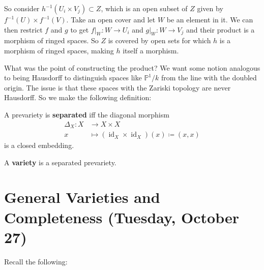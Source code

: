 So consider \(h^{-1} (U_i \times V_j) \subset Z\), which is an open
subset of \(Z\) given by \(f^{-1}(U) \times f^{-1}(V)\). Take an open
cover and let \(W\) be an element in it. We can then restrict \(f\) and
\(g\) to get \({ \left.{{f}} \right|_{{W}} }:W\to U_i\) and
\({ \left.{{g}} \right|_{{W}} }:W\to V_j\) and their product is a
morphism of ringed spaces. So \(Z\) is covered by open sets for which
\(h\) is a morphism of ringed spaces, making \(h\) itself a morphism.

What was the point of constructing the product? We want some notion
analogous to being Hausdorff to distinguish spaces like
\({\mathbb{P}}^1/k\) from the line with the doubled origin. The issue is
that these spaces with the Zariski topology are never Hausdorff. So we
make the following definition:

\begin{definition}[Separated]

A prevariety is \textbf{separated} iff the diagonal morphism
\begin{align*}  
\Delta_X: X &\to X\times X \\
x &\mapsto (\operatorname{id}_X \times\operatorname{id}_X)(x) \coloneqq(x, x)
\end{align*}
is a closed embedding.

\end{definition}

\begin{definition}[Variety]

A \textbf{variety} is a separated prevariety.

\end{definition}

\hypertarget{general-varieties-and-completeness-tuesday-october-27}{%
\section{General Varieties and Completeness (Tuesday, October
27)}\label{general-varieties-and-completeness-tuesday-october-27}}

Recall the following:

